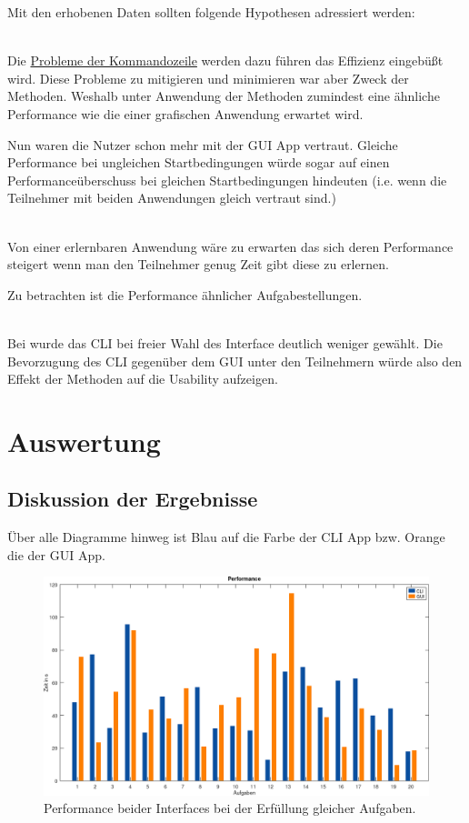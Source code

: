\documentclass[oneside,bibliography=totocnumbered,BCOR=5mm]{scrbook}
\begin{document}
Mit den erhobenen Daten sollten folgende Hypothesen adressiert werden:

\\
Die \hyperref[sec:cli-problems]{Probleme der Kommandozeile} werden dazu führen
das Effizienz eingebüßt wird. Diese Probleme zu mitigieren und minimieren war
aber Zweck der Methoden. Weshalb unter Anwendung der Methoden zumindest eine
ähnliche Performance wie die einer grafischen Anwendung erwartet wird.

Nun waren die Nutzer schon mehr mit der GUI App vertraut. Gleiche Performance
bei ungleichen Startbedingungen würde sogar auf einen Performanceüberschuss
bei gleichen Startbedingungen hindeuten (i.e. wenn die Teilnehmer mit beiden
Anwendungen gleich vertraut sind.)

\\
Von einer erlernbaren Anwendung wäre zu erwarten das sich deren Performance
steigert wenn man den Teilnehmer genug Zeit gibt diese zu erlernen.

Zu betrachten ist die Performance ähnlicher Aufgabestellungen.

\\
Bei \textcite{Westerman_1997} wurde das CLI bei freier Wahl des Interface
deutlich weniger gewählt. Die Bevorzugung des CLI gegenüber dem GUI unter den
Teilnehmern würde also den Effekt der Methoden auf die Usability aufzeigen.

\section{Auswertung}
\label{sec:auswertung}

\subsection{Diskussion der Ergebnisse}

Über alle Diagramme hinweg ist Blau auf die Farbe der CLI App bzw. Orange die
der GUI App.

\begin{figure}[H]
  \centering
  \includegraphics[scale=0.36]{performance.png}
  \caption{Performance beider Interfaces bei der Erfüllung gleicher Aufgaben.}
  \label{fig:performance}
\end{figure}
\end{document}
